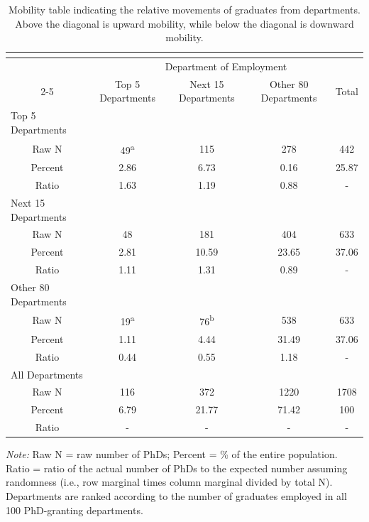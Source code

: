 \documentclass{article}
\begin{document}
\begin{table}[ht]
\caption{Mobility table indicating the relative movements of graduates from departments. Above the diagonal is upward mobility, while below the diagonal is downward mobility.}
\label{tab:mobility-table-2020}
\begin{tabular}{ccccc}
\multicolumn{1}{l}{}                        & \multicolumn{1}{l}{} & \multicolumn{1}{l}{} & \multicolumn{1}{l}{} & \multicolumn{1}{l}{} \\ \hline
\multicolumn{1}{l}{}                        & \multicolumn{4}{c}{Department of Employment}                                              \\ \cline{2-5}
\multicolumn{1}{l}{PhD Granting Department} & Top 5 Departments    & Next 15 Departments  & Other 80 Departments & Total                \\ \hline
\multicolumn{1}{l}{Top 5 Departments}    &      &       &       &       \\
Raw N                                    & 49\textsuperscript{a}   & 115   & 278   & 442   \\
Percent                                  & 2.86 & 6.73  & 0.16  & 25.87 \\
Ratio                                    & 1.63 & 1.19  & 0.88  & -     \\
\multicolumn{1}{l}{Next 15 Departments}  &      &       &       &       \\
Raw N                                    & 48   & 181   & 404   & 633   \\
Percent                                  & 2.81 & 10.59 & 23.65 & 37.06 \\
Ratio                                    & 1.11 & 1.31  & 0.89  & -     \\
\multicolumn{1}{l}{Other 80 Departments} &      &       &       &       \\
Raw N                                    & 19\textsuperscript{a}   & 76\textsuperscript{b}    & 538   & 633   \\
Percent                                  & 1.11 & 4.44  & 31.49 & 37.06 \\
Ratio                                    & 0.44 & 0.55  & 1.18  & -     \\
\multicolumn{1}{l}{All Departments}      &      &       &       &       \\
Raw N                                    & 116  & 372   & 1220  & 1708  \\
Percent                                  & 6.79 & 21.77 & 71.42 & 100   \\
Ratio                                    & -    & -     & -     & -     \\ \hline
\end{tabular}
\emph{Note:} Raw N = raw number of PhDs; Percent = \% of the entire population. Ratio = ratio of the actual number of PhDs to the expected number assuming randomness (i.e., row marginal times column marginal divided by total N). Departments are ranked according to the number of graduates employed in all 100 PhD-granting departments.


\end{table}
\end{document}
